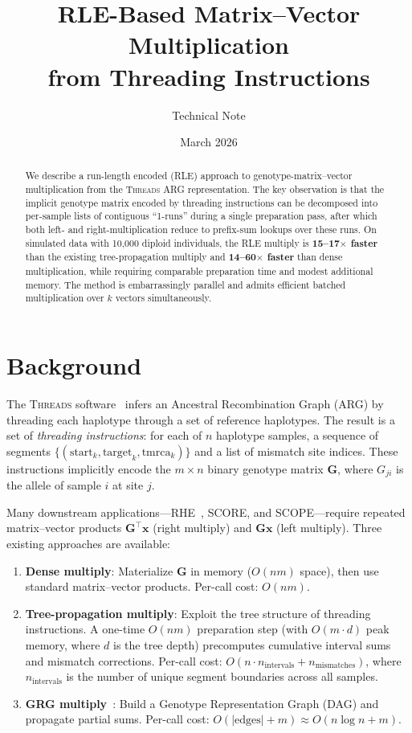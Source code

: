 \documentclass[11pt]{article}
\title{RLE-Based Matrix--Vector Multiplication\\from Threading Instructions}
\author{Technical Note}
\date{March 2026}
\begin{document}
\maketitle

\begin{abstract}
We describe a run-length encoded (RLE) approach to genotype-matrix--vector
multiplication from the \textsc{Threads} ARG representation.  The key
observation is that the implicit genotype matrix encoded by threading
instructions can be decomposed into per-sample lists of contiguous
``1-runs'' during a single preparation pass, after which both left- and
right-multiplication reduce to prefix-sum lookups over these runs.  On
simulated data with 10{,}000 diploid individuals, the RLE multiply is
\textbf{15--17$\times$ faster} than the existing tree-propagation multiply
and \textbf{14--60$\times$ faster} than dense multiplication, while
requiring comparable preparation time and modest additional memory.  The
method is embarrassingly parallel and admits efficient batched
multiplication over $k$ vectors simultaneously.
\end{abstract}

\section{Background}

The \textsc{Threads} software~\cite{gunnarsson2025} infers an Ancestral
Recombination Graph (ARG) by threading each haplotype through a set of
reference haplotypes.  The result is a set of \emph{threading instructions}:
for each of $n$ haplotype samples, a sequence of segments
$\{(\text{start}_k, \text{target}_k, \text{tmrca}_k)\}$ and a list of
mismatch site indices.  These instructions implicitly encode the $m \times n$
binary genotype matrix $\mathbf{G}$, where $G_{ji}$ is the allele of sample
$i$ at site $j$.

Many downstream applications---RHE~\cite{pazokitoroudi2020}, SCORE, and
SCOPE---require repeated matrix--vector products $\mathbf{G}^\top
\mathbf{x}$ (right multiply) and $\mathbf{G}\mathbf{x}$ (left multiply).
Three existing approaches are available:

\begin{enumerate}
\item \textbf{Dense multiply}: Materialize $\mathbf{G}$ in memory
($O(nm)$ space), then use standard matrix--vector products.  Per-call cost:
$O(nm)$.
\item \textbf{Tree-propagation multiply}: Exploit the tree structure of
threading instructions.  A one-time $O(nm)$ preparation step (with $O(m
\cdot d)$ peak memory, where $d$ is the tree depth) precomputes cumulative
interval sums and mismatch corrections.  Per-call cost: $O(n \cdot
n_\text{intervals} + n_\text{mismatches})$, where $n_\text{intervals}$ is
the number of unique segment boundaries across all samples.
\item \textbf{GRG multiply}~\cite{dehaas2024}: Build a Genotype
Representation Graph (DAG) and propagate partial sums.  Per-call cost:
$O(|\text{edges}| + m) \approx O(n \log n + m)$.
\end{enumerate}
\end{document}

